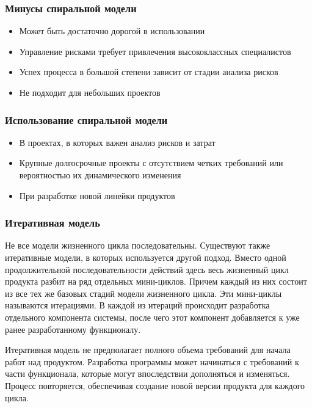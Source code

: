 \documentclass{../industrial-development}
\begin{document}
\begin{frame} \frametitle{Минусы спиральной модели}
\begin{itemize}
\item Может быть достаточно дорогой в использовании
\item Управление рисками требует привлечения высококлассных специалистов
\item Успех процесса в большой степени зависит от стадии анализа рисков
\item Не подходит для небольших проектов
\end{itemize}
\end{frame}

\begin{frame} \frametitle{Использование спиральной модели}
\begin{itemize}
\item В проектах, в которых важен анализ рисков и затрат
\item Крупные долгосрочные проекты с отсутствием четких требований или вероятностью их динамического изменения
\item При разработке новой линейки продуктов
\end{itemize}
\end{frame}

\begin{frame} \frametitle{Итеративная модель}
\begin{flushleft}
	Не все модели жизненного цикла последовательны. Существуют также итеративные модели, в которых используется другой подход. Вместо одной продолжительной последовательности действий здесь весь жизненный цикл продукта разбит на ряд отдельных мини-циклов. Причем каждый из них состоит из все тех же базовых стадий модели жизненного цикла. Эти мини-циклы называются итерациями. В каждой из итераций происходит разработка отдельного компонента системы, после чего этот компонент добавляется к уже ранее разработанному функционалу.
	
	Итеративная модель не предполагает полного объема требований для начала работ над продуктом. Разработка программы может начинаться с требований к части функционала, которые могут впоследствии дополняться и изменяться.  Процесс повторяется, обеспечивая создание новой версии продукта для каждого цикла.
\end{flushleft}
\end{frame}
\end{document}
